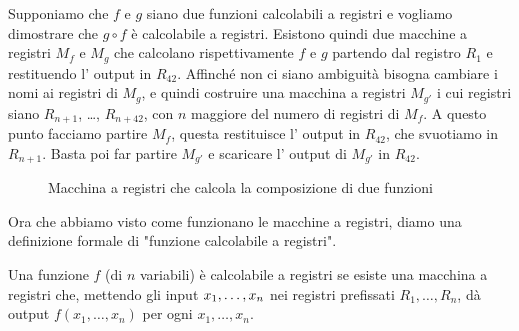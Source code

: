 \begin{esempio}[Composizione]

    Supponiamo che $ f $ e $ g $ siano due funzioni calcolabili a
    registri e vogliamo dimostrare che $ g\circ f $ \`e calcolabile a
    registri. Esistono quindi due macchine a registri \( M_f \) e \(
    M_g \) che calcolano rispettivamente \( f \) e \( g \) partendo
    dal registro \( R_1 \) e restituendo l' output in \( R_42
    \). Af\mbox{}f\mbox{}inch\'e non ci siano ambiguit\`a bisogna
    cambiare i nomi ai registri di \( M_g \), e quindi costruire una
    macchina a registri \( M_{g'} \) i cui re\-gi\-stri siano \(
    R_{n+1} \), \ldots, \( R_{n+42} \), con \( n \) maggiore del
    numero di registri di \( M_f \). A questo punto facciamo partire
    \( M_f \), questa restituisce l' output in \( R_{42} \), che
    svuotiamo in \( R_{n+1} \). Basta poi far partire \( M_{g'} \) e
    scaricare l' output di \( M_{g'} \) in \( R_{42} \).


    \begin{figure}[hbpt]
    \hspace{0cm} 
     \caption{Macchina a registri che calcola la composizione di due funzioni}
    \end{figure}
\end{esempio}

Ora che abbiamo visto come funzionano le macchine a registri, diamo
una definizione formale di "funzione calcolabile a re\-gi\-stri".

\begin{teorema}
Una funzione \( f \) (di \( n \) variabili) \`e calcolabile a registri
se esiste una macchina a registri che, mettendo gli input \( x_1,
\ldots,\\ x_n \) nei registri pref\mbox{}issati \( R_1, \ldots, R_n
\), d\`a output \( f(x_1, \ldots, x_n) \) per ogni \( x_1, \ldots, x_n
\).
\end{teorema}
